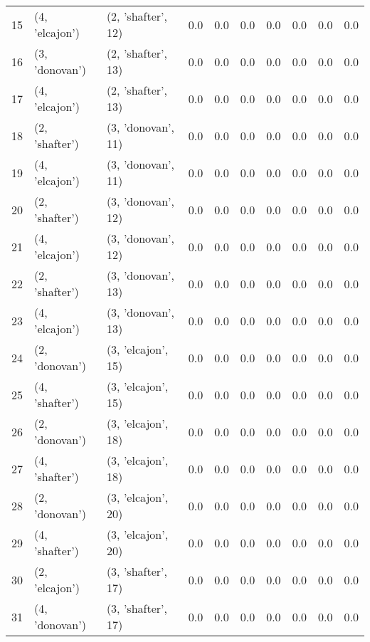 \begin{tabular}{lllrrrrrrr}
15 &   (4, 'elcajon') &  (2, 'shafter', 12) &     0.0 &       0.0 &     0.0 &     0.0 &     0.0 &       0.0 &      0.0 \\
16 &   (3, 'donovan') &  (2, 'shafter', 13) &     0.0 &       0.0 &     0.0 &     0.0 &     0.0 &       0.0 &      0.0 \\
17 &   (4, 'elcajon') &  (2, 'shafter', 13) &     0.0 &       0.0 &     0.0 &     0.0 &     0.0 &       0.0 &      0.0 \\
18 &   (2, 'shafter') &  (3, 'donovan', 11) &     0.0 &       0.0 &     0.0 &     0.0 &     0.0 &       0.0 &      0.0 \\
19 &   (4, 'elcajon') &  (3, 'donovan', 11) &     0.0 &       0.0 &     0.0 &     0.0 &     0.0 &       0.0 &      0.0 \\
20 &   (2, 'shafter') &  (3, 'donovan', 12) &     0.0 &       0.0 &     0.0 &     0.0 &     0.0 &       0.0 &      0.0 \\
21 &   (4, 'elcajon') &  (3, 'donovan', 12) &     0.0 &       0.0 &     0.0 &     0.0 &     0.0 &       0.0 &      0.0 \\
22 &   (2, 'shafter') &  (3, 'donovan', 13) &     0.0 &       0.0 &     0.0 &     0.0 &     0.0 &       0.0 &      0.0 \\
23 &   (4, 'elcajon') &  (3, 'donovan', 13) &     0.0 &       0.0 &     0.0 &     0.0 &     0.0 &       0.0 &      0.0 \\
24 &   (2, 'donovan') &  (3, 'elcajon', 15) &     0.0 &       0.0 &     0.0 &     0.0 &     0.0 &       0.0 &      0.0 \\
25 &   (4, 'shafter') &  (3, 'elcajon', 15) &     0.0 &       0.0 &     0.0 &     0.0 &     0.0 &       0.0 &      0.0 \\
26 &   (2, 'donovan') &  (3, 'elcajon', 18) &     0.0 &       0.0 &     0.0 &     0.0 &     0.0 &       0.0 &      0.0 \\
27 &   (4, 'shafter') &  (3, 'elcajon', 18) &     0.0 &       0.0 &     0.0 &     0.0 &     0.0 &       0.0 &      0.0 \\
28 &   (2, 'donovan') &  (3, 'elcajon', 20) &     0.0 &       0.0 &     0.0 &     0.0 &     0.0 &       0.0 &      0.0 \\
29 &   (4, 'shafter') &  (3, 'elcajon', 20) &     0.0 &       0.0 &     0.0 &     0.0 &     0.0 &       0.0 &      0.0 \\
30 &   (2, 'elcajon') &  (3, 'shafter', 17) &     0.0 &       0.0 &     0.0 &     0.0 &     0.0 &       0.0 &      0.0 \\
31 &   (4, 'donovan') &  (3, 'shafter', 17) &     0.0 &       0.0 &     0.0 &     0.0 &     0.0 &       0.0 &      0.0 \\

\end{tabular}
